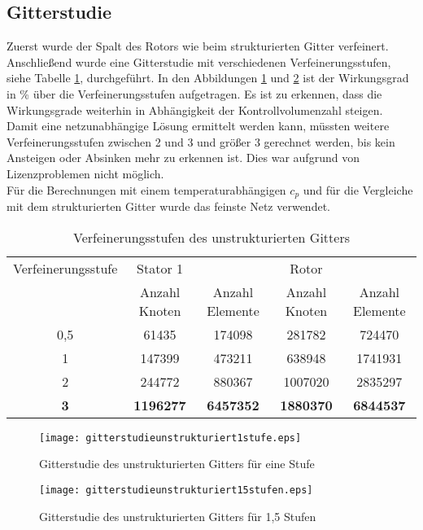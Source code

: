 \subsection{Gitterstudie}
Zuerst wurde der Spalt des Rotors wie beim strukturierten Gitter verfeinert. Anschließend wurde eine Gitterstudie mit verschiedenen Verfeinerungsstufen, siehe Tabelle \ref{tab:verfeinerungenunstrukturiert}, durchgeführt. In den Abbildungen \ref{fig:gitterunstrukturiert1stufe} und \ref{fig:gitterunstrukturiert15stufen} ist der Wirkungsgrad in \% über die Verfeinerungsstufen aufgetragen. Es ist zu erkennen, dass die Wirkungsgrade weiterhin in Abhängigkeit der Kontrollvolumenzahl steigen. Damit eine netzunabhängige Lösung ermittelt werden kann, müssten weitere Verfeinerungsstufen zwischen 2 und 3 und größer 3 gerechnet werden, bis kein Ansteigen oder Absinken mehr zu erkennen ist. Dies war aufgrund von Lizenzproblemen nicht möglich.\\
Für die Berechnungen mit einem temperaturabhängigen $c_p$ und für die Vergleiche mit dem strukturierten Gitter wurde das feinste Netz verwendet.
\begin{table}[h]
		\centering
		\caption{Verfeinerungsstufen des unstrukturierten Gitters}
	\begin{tabular}{ c| c | c| c| c}
Verfeinerungsstufe	&	Stator 1	&		&	Rotor	&		\\
&	Anzahl Knoten	&	Anzahl Elemente	&	Anzahl Knoten	&	Anzahl Elemente	\\
\hline									
0,5	&	61435	&	174098	&	281782	&	724470	\\
1	&	147399	&	473211	&	638948	&	1741931	\\
2	&	244772	&	880367	&	1007020	&	2835297	\\
\textbf{3}	&	\textbf{1196277}	&	\textbf{6457352}	&	\textbf{1880370}	&	\textbf{6844537}	\\

	\end{tabular}
		\label{tab:verfeinerungenunstrukturiert}
\end{table}
\begin{figure}[htbp]
	\centering
	\texttt{[image: gitterstudieunstrukturiert1stufe.eps]}
	\caption{Gitterstudie des unstrukturierten Gitters für eine Stufe} \label{fig:gitterunstrukturiert1stufe}
\end{figure}

\begin{figure}[htbp]
	\centering
	\texttt{[image: gitterstudieunstrukturiert15stufen.eps]}
	\caption{Gitterstudie des unstrukturierten Gitters für 1,5 Stufen}
	\label{fig:gitterunstrukturiert15stufen}
\end{figure}